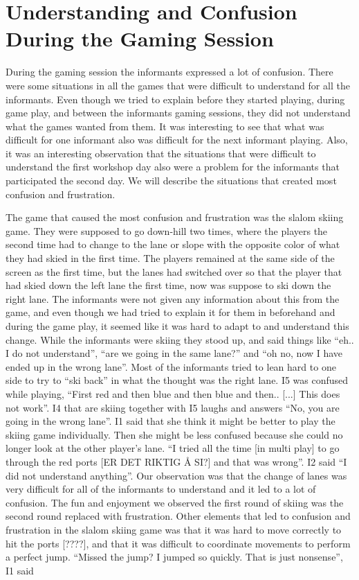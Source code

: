\section{Understanding and Confusion During the Gaming Session}
During the gaming session the informants expressed a lot of confusion. There were some situations in all the games that were difficult to understand for all the informants. Even though we tried to explain before they started playing, during game play, and between the informants gaming sessions, they did not understand what the games wanted from them. It was interesting to see that what was difficult for one informant also was difficult for the next informant playing. Also, it was an interesting observation that the situations that were difficult to understand the first workshop day also were a problem for the informants that participated the second day. We will describe the situations that created most confusion and frustration.

The game that caused the most confusion and frustration was the slalom skiing game. They were supposed to go down-hill two times, where the players the second time had to change to the lane or slope with the opposite color of what they had skied in the first time. The players remained at the same side of the screen as the first time, but the lanes had switched over so that the player that had skied down the left lane the first time, now was suppose to ski down the right lane. The informants were not given any information about this from the game, and even though we had tried to explain it for them in beforehand and during the game play, it seemed like it was hard to adapt to and understand this change. While the informants were skiing they stood up, and said things like “eh.. I do not understand”, “are we going in the same lane?” and “oh no, now I have ended up in the wrong lane”. Most of the informants tried to lean hard to one side to try to “ski back” in what the thought was the right lane. I5 was confused while playing, “First red and then blue and then blue and then.. [...] This does not work”. I4 that are skiing together with I5 laughs and answers “No, you are going in the wrong lane”. I1 said that she think it might be better to play the skiing game individually. Then she might be less confused because she could no longer look at the other player’s lane. “I tried all the time [in multi play] to go through the red ports [ER DET RIKTIG Å SI?] and that was wrong”. I2 said “I did not understand anything”. Our observation was that the change of lanes was very difficult for all of the informants to understand and it led to a lot of confusion. The fun and enjoyment we observed the first round of skiing was the second round replaced with frustration. Other elements that led to confusion and frustration in the slalom skiing game was that it was hard to move correctly to hit the ports [????], and that it was difficult to coordinate movements to perform a perfect jump. “Missed the jump? I jumped so quickly. That is just nonsense”, I1 said

